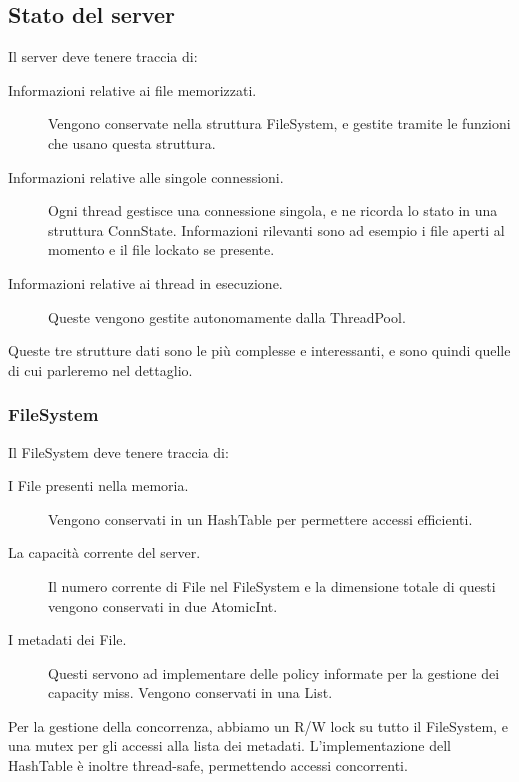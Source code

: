 \documentclass[11pt]{article}
\begin{document}
\begin{flushleft}
\subsection{Stato del server}
Il server deve tenere traccia di:
\begin{description}

\item[Informazioni relative ai file memorizzati.] Vengono conservate nella struttura FileSystem, e gestite tramite le funzioni che usano questa struttura.

\item[Informazioni relative alle singole connessioni.] Ogni thread gestisce una connessione singola, e ne ricorda lo stato in una struttura ConnState. Informazioni rilevanti sono ad esempio i file aperti al momento e il file lockato se presente.

\item[Informazioni relative ai thread in esecuzione.] Queste vengono gestite autonomamente dalla ThreadPool.

\end{description}

Queste tre strutture dati sono le più complesse e interessanti, e sono quindi quelle di cui parleremo nel dettaglio.

\subsubsection{FileSystem}
Il FileSystem deve tenere traccia di:
\begin{description}

\item[I File presenti nella memoria.] Vengono conservati in un HashTable per permettere accessi efficienti.

\item[La capacità corrente del server.] Il numero corrente di File nel FileSystem e la dimensione totale di questi vengono conservati in due AtomicInt.

\item[I metadati dei File.] Questi servono ad implementare delle policy informate per la gestione dei capacity miss. Vengono conservati in una List.

\end{description}

Per la gestione della concorrenza, abbiamo un R/W lock su tutto il FileSystem, e una mutex per gli accessi alla lista dei metadati. L'implementazione dell HashTable è inoltre thread-safe, permettendo accessi concorrenti.


\end{flushleft}
\end{document}
